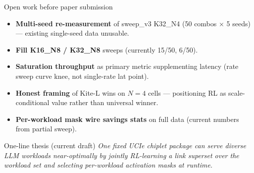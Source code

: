\documentclass[aspectratio=169]{beamer}
\begin{document}
\begin{frame}{Open work before paper submission}
\begin{itemize}
  \item \textbf{Multi-seed re-measurement} of sweep\_v3 K32\_N4
        (50 combos $\times$ 5 seeds) --- existing single-seed data unusable.
  \item \textbf{Fill K16\_N8 / K32\_N8} sweeps (currently 15/50, 6/50).
  \item \textbf{Saturation throughput} as primary metric supplementing latency
        (rate sweep curve knee, not single-rate lat point).
  \item \textbf{Honest framing} of Kite-L wins on $N{=}4$ cells --- positioning
        RL as scale-conditional value rather than universal winner.
  \item \textbf{Per-workload mask wire savings stats} on full data
        (current numbers from partial sweep).
\end{itemize}

\vspace{0.6em}
\begin{block}{One-line thesis (current draft)}
\centering
\emph{One fixed UCIe chiplet package can serve diverse LLM workloads
near-optimally by jointly RL-learning a link superset over the workload
set and selecting per-workload activation masks at runtime.}
\end{block}
\end{frame}
\end{document}
